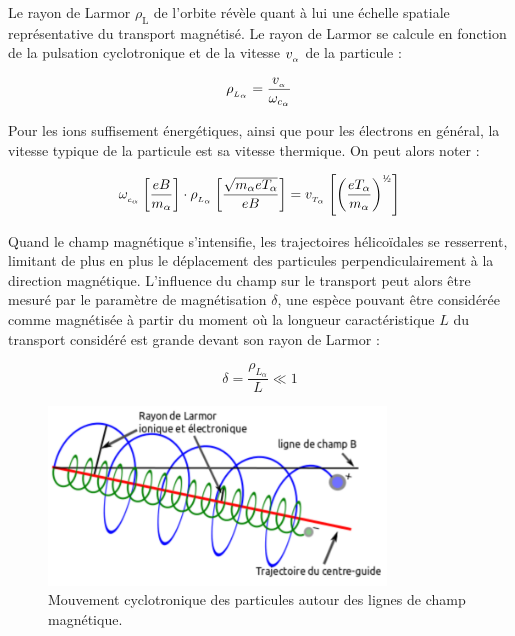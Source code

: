 \begin{refsection}
Le rayon de Larmor $\rho_\text{L}$ de l'orbite révèle quant à lui une échelle
spatiale représentative du transport magnétisé. Le rayon de Larmor se
calcule en fonction de la pulsation cyclotronique et de la vitesse
$v_{_{\alpha}}$ de la particule :

\begin{equation}
\rho_{_{L_{\alpha}}}
=\frac{v_{_{\alpha}}}{\omega_{c_{\alpha}}}
\end{equation}

Pour les ions suffisement énergétiques, ainsi que pour les électrons en général,
la vitesse typique de la particule est sa vitesse thermique. On peut alors noter :

\begin{equation}
\omega\indice{c_{\alpha}}\left[\frac{e B}{m_\alpha}\right]
\cdot\rho\indice{L_{\alpha}}\left[\frac{\sqrt{m_\alpha eT_\alpha}}{eB}\right]
=v\indice{T_{\alpha}}\left[\left(\frac{eT_{\alpha}}{m_{\alpha}}\right)^{\text{\textonehalf}}\right]
\end{equation}

Quand le champ magnétique s'intensifie, les trajectoires
hélicoïdales se resserrent, limitant de plus en plus le déplacement des
particules perpendiculairement à la direction magnétique. L'influence du champ
sur le transport peut alors être mesuré par le paramètre de
magnétisation $\delta$, une espèce pouvant être considérée comme magnétisée à
partir du moment où la longueur caractéristique $L$ du transport considéré est
grande devant son rayon de Larmor :

\begin{equation}
\delta=\frac{\rho_{L_{\alpha}}}{L}\ll 1
\end{equation}

\begin{figure}[htbp]
\centering
\includegraphics[width=0.8\textwidth]{figures/mouvementCyclotron.png}
{\caption{Mouvement cyclotronique des particules autour des lignes de champ
magnétique.}\label{1-particleDrifts}}
\end{figure}


\end{refsection}
